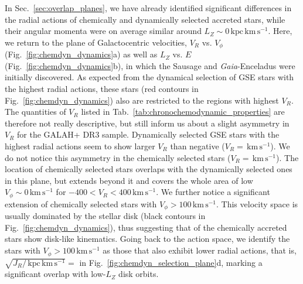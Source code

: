 \documentclass[fleqn,usenatbib]{mnras}
\newcommand{\kms}{\,\mathrm{km\,s^{-1}}}	%
\newcommand{\kpckms}{\,\mathrm{kpc\,km\,s^{-1}}}	%
\newcommand{\Gaia}{\textit{Gaia}\xspace} %
\begin{document}
In Sec.~\ref{sec:overlap_planes}, we have already identified significant differences in the radial actions of chemically and dynamically selected accreted stars, while their angular momenta were on average similar around $L_Z \sim 0 \kpckms$. Here, we return to the plane of Galactocentric velocities, $V_R$ vs. $V_\phi$ (Fig.~\ref{fig:chemdyn_dynamics}a) as well as $L_Z$ vs. $E$ (Fig.~\ref{fig:chemdyn_dynamics}b), in which the Sausage \citep{Belokurov2018} and \Gaia-Enceladus \citep{Helmi2018} were initially discovered. As expected from the dynamical selection of GSE stars with the highest radial actions, these stars (red contours in Fig.~\ref{fig:chemdyn_dynamics}) also are restricted to the regions with highest $V_R$. The quantities of $V_R$ listed in Tab.~\ref{tab:chronochemodynamic_properties} are therefore not really descriptive, but still inform us about a slight asymmetry in $V_R$ for the GALAH+ DR3 sample. Dynamically selected GSE stars with the highest radial actions seem to show larger $V_R$ than negative ($V_R=$$\kms$). We do not notice this asymmetry in the chemically selected stars ($V_R=$$\kms$). The location of chemically selected stars overlaps with the dynamically selected ones in this plane, but extends beyond it and covers the whole area of low $V_\phi \sim 0 \kms$ for $-400 < V_R < 400\kms$. We further notice a significant extension of  chemically selected stars with $V_\phi > 100 \kms$. This velocity space is usually dominated by the stellar disk (black contours in Fig.~\ref{fig:chemdyn_dynamics}), thus suggesting that  of the chemically accreted stars show disk-like kinematics. Going back to the action space, we identify the stars with $V_\phi > 100 \kms$ as those that also exhibit lower radial actions, that is, $\sqrt{J_R / \kpckms} = $ in Fig.~\ref{fig:chemdyn_selection_plane}d, marking a significant overlap with low-$L_Z$ disk orbits.
\end{document}
